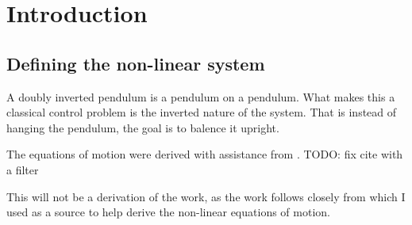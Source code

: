 \section{Introduction}

\subsection{Defining the non-linear system}
A doubly inverted pendulum is a pendulum on a pendulum. What makes this a classical control problem is the
inverted nature of the system. That is instead of hanging the pendulum, the goal is to balence it upright.

The equations of motion were derived with assistance from \cite{eq_of_motion}.
{\LARGE \color{red} TODO: fix cite with a filter}

This will not be a derivation of the work, as the work follows closely from \cite{eq_of_motion} which I used
as a source to help derive the non-linear equations of motion. 


